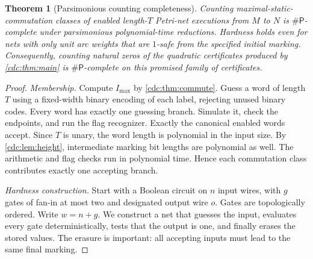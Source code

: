 \documentclass[11pt,a4paper]{article}
\newtheorem{theorem}{Theorem}[section]
\theoremstyle{definition}
\theoremstyle{remark}
\newcommand{\sharpP}{\mathsf{\#P}}
\begin{document}
\begin{theorem}[Parsimonious counting completeness]\label{cdc:thm:counting}
Counting maximal-static-commutation classes of enabled length-$T$ Petri-net executions from $M$ to $N$ is $\sharpP$-complete under parsimonious polynomial-time reductions. Hardness holds even for nets with only unit arc weights that are $1$-safe from the specified initial marking. Consequently, counting natural zeros of the quadratic certificates produced by \cref{cdc:thm:main} is $\sharpP$-complete on this promised family of certificates.
\end{theorem}
\begin{proof}
\emph{Membership.} Compute $I_{\max}$ by \cref{cdc:thm:commute}. Guess a word of length $T$ using a fixed-width binary encoding of each label, rejecting unused binary codes. Every word has exactly one guessing branch. Simulate it, check the endpoints, and run the flag recognizer. Exactly the canonical enabled words accept. Since $T$ is unary, the word length is polynomial in the input size. By \cref{cdc:lem:height}, intermediate marking bit lengths are polynomial as well. The arithmetic and flag checks run in polynomial time. Hence each commutation class contributes exactly one accepting branch.

\emph{Hardness construction.} Start with a Boolean circuit on $n$ input wires, with $g$ gates of fan-in at most two and designated output wire $o$. Gates are topologically ordered. Write $w=n+g$. We construct a net that guesses the input, evaluates every gate deterministically, tests that the output is one, and finally erases the stored values. The erasure is important: all accepting inputs must lead to the same final marking.


\end{proof}
\end{document}
